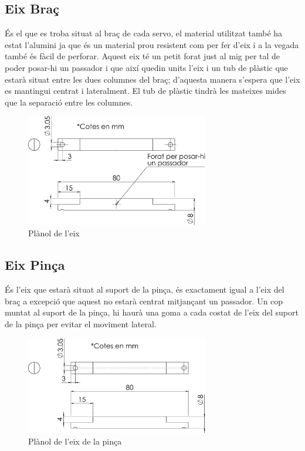 \documentclass[a4paper, 12pt]{article}
\begin{document}
\subsection{Eix Braç}
És el que es troba situat al braç de cada servo, el material utilitzat també ha estat l'alumini ja que és un material prou resistent com per fer d'eix i a la vegada també és fàcil de perforar.
Aquest eix té un petit forat just al mig per tal de poder posar-hi un passador i que així quedin units l'eix i un tub de plàstic que estarà situat entre les dues columnes del braç; d'aquesta manera s'espera que l'eix es mantingui centrat i lateralment. El tub de plàstic tindrà les mateixes mides que la separació entre les columnes.
\begin{figure}[h!]
\centering
\includegraphics[width=8cm]{./sketch/eix}
\caption{Plànol de l'eix}
\end{figure}

\subsection{Eix Pinça}
És l'eix que estarà situat al suport de la pinça, és exactament igual a l'eix del braç a excepció que aquest no estarà centrat mitjançant un passador. Un cop muntat al suport de la pinça, hi haurà una goma a cada costat de l'eix del suport de la pinça per evitar el moviment lateral.
\begin{figure}[h!]
\centering
\includegraphics[width=8cm]{./sketch/eix2}
\caption{Plànol de l'eix de la pinça}
\end{figure}
\end{document}
